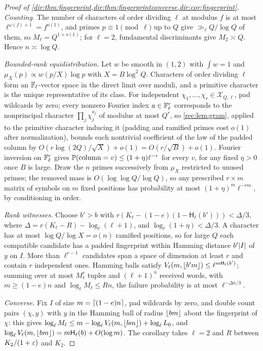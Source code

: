 \begin{proof}[Proof of \cref{dir:thm:fingerprint,dir:thm:fingerprintconverse,dir:cor:fingerprint}]
\emph{Counting.} The number of characters of order dividing $\ell$ at modulus $f$ is at most
$\ell^{\omega(f)+1}=f^{o(1)}$, and primes $p\equiv1\pmod\ell$ up to $Q$ give $\gg_\ell Q/\log Q$ of them, so
$M_\ell=Q^{1+o(1)}$; for $\ell=2$, fundamental discriminants give $M_2\asymp Q$. Hence $n\asymp\log Q$.

\emph{Bounded-rank equidistribution.} Let $w$ be smooth in $(1,2)$ with $\int w=1$ and
$\mu_X(p)\propto w(p/X)\log p$ with $X=B\log^2Q$. Characters of order dividing $\ell$ form an $\mathbb{F}_\ell$-vector
space in the direct limit over moduli, and a primitive character is the unique representative of its
class. For independent $\chi_1,\dots,\chi_r\in\mathcal X_{Q,\ell}$, pad wildcards by zero; every nonzero Fourier
index $a\in\mathbb{F}_\ell^r$ corresponds to the nonprincipal character $\prod_j\chi_j^{a_j}$ of modulus at most $Q^r$, so
\cref{rec:lem:gram}, applied to the primitive character inducing it (padding and ramified primes cost
$o(1)$ after normalization), bounds each nontrivial coefficient of the law of the padded column by
$O(r\log(2Q)/\sqrt X)+o(1)=O(r/\sqrt B)+o(1)$.
Fourier inversion on $\mathbb{F}_\ell^r$ gives $\mathbb{P}(\text{column}=v)\le(1+\eta)\ell^{-r}$ for every $v$, for any fixed
$\eta>0$ once $B$ is large. Draw the $n$ primes successively from $\mu_X$ restricted to unused primes; the
removed mass is $O(\log\log Q/\log Q)$, so any prescribed $r\times m$ matrix of symbols on $m$ fixed positions
has probability at most $(1+\eta)^m\ell^{-rm}$, by conditioning in order.

\emph{Rank witnesses.} Choose $b'>b$ with $r(K_\ell-(1-e)(1-\mathsf H_\ell(b')))<\Delta/3$, where
$\Delta=r(K_\ell-R)-\log_\ell(\ell+1)$, and $\log_\ell(1+\eta)<\Delta/3$. A character has at most
$\log Q/\log X=o(n)$ ramified positions, so for large $Q$ each compatible candidate has a padded fingerprint
within Hamming distance $b'\lvert I\rvert$ of $y$ on $I$. More than $\ell^{r-1}$ candidates span a space of dimension at
least $r$ and contain $r$ independent ones. Hamming balls satisfy $V_\ell(m,\lfloor b'm\rfloor)\le\ell^{m\mathsf H_\ell(b')}$;
summing over at most $M_\ell^r$ tuples and $(\ell+1)^n$ received words, with $m\ge(1-e)n$ and
$\log_\ell M_\ell\le Rn$, the failure probability is at most $\ell^{-\Delta n/3}$.

\emph{Converse.} Fix $I$ of size $m=\lceil(1-e)n\rceil$, pad wildcards by zero, and double count pairs
$(\chi,y)$ with $y$ in the Hamming ball of radius $\lfloor bm\rfloor$ about the fingerprint of $\chi$: this gives
$\log_\ell M_\ell\le m-\log_\ell V_\ell(m,\lfloor bm\rfloor)+\log_\ell L_0$, and $\log_\ell V_\ell(m,\lfloor bm\rfloor)=m\mathsf H_\ell(b)+O(\log m)$.
The corollary takes $\ell=2$ and $R$ between $K_2/(1+\varepsilon)$ and $K_2$.
\end{proof}

